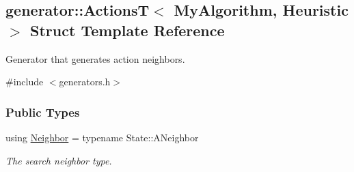 \hypertarget{structgenerator_1_1ActionsT}{}\subsection{generator\+:\+:ActionsT$<$ My\+Algorithm, Heuristic $>$ Struct Template Reference}
\label{structgenerator_1_1ActionsT}


Generator that generates action neighbors.  




{\ttfamily \#include $<$generators.\+h$>$}

\subsubsection*{Public Types}
\begin{DoxyCompactItemize}
\item 
using \hyperlink{structgenerator_1_1ActionsT_a40dcae773c79aa663b32c939474bcf13}{Neighbor} = typename State\+::\+A\+Neighbor\hypertarget{structgenerator_1_1ActionsT_a40dcae773c79aa663b32c939474bcf13}{}\label{structgenerator_1_1ActionsT_a40dcae773c79aa663b32c939474bcf13}

\begin{DoxyCompactList}\small\item\em The search neighbor type. \end{DoxyCompactList}\end{DoxyCompactItemize}

